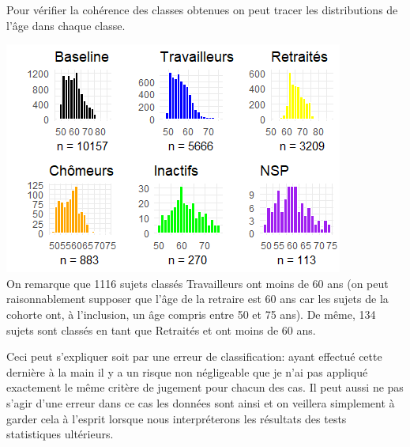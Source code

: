 \documentclass{book}
\begin{document}
Pour vérifier la cohérence des classes obtenues on peut tracer les distributions de l'âge dans chaque classe.

\includegraphics[scale=1.3]{plot_grid_hist_age_activproBis.png}\\

On remarque que 1116 sujets classés Travailleurs ont moins de 60 ans (on peut raisonnablement supposer que l'âge de la retraire est 60 ans car les sujets de la cohorte ont, à l'inclusion, un âge compris entre 50 et 75 ans).
De même, 134 sujets sont classés en tant que Retraités et ont moins de 60 ans.

Ceci peut s'expliquer soit par une erreur de classification: ayant effectué cette dernière à la main il y a un risque non négligeable que je n'ai pas appliqué exactement le même critère de jugement pour chacun des cas. Il peut aussi ne pas s'agir d'une erreur dans ce cas les données sont ainsi et on veillera simplement à garder cela à l'esprit lorsque nous interpréterons les résultats des tests statistiques ultérieurs.
\end{document}
